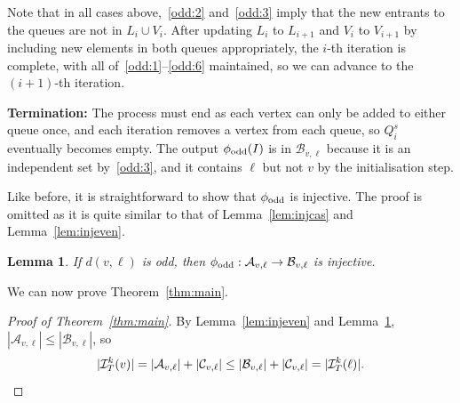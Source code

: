 \documentclass[11pt]{article}
\newtheorem{lemma}[theorem]{Lemma}
\theoremstyle{definition}
\newcommand{\cI}{\mathcal{I}}
\begin{document}
Note that in all cases above,~\ref{odd:2} and~\ref{odd:3} imply that the new entrants to the queues are not in $L_i\cup V_i$. After updating $L_i$ to $L_{i+1}$ and $V_i$ to $V_{i+1}$ by including new elements in both queues appropriately, the $i$-th iteration is complete, with all of~\ref{odd:1}--\ref{odd:6} maintained, so we can advance to the $(i+1)$-th iteration. 

\medskip

\noindent\textbf{Termination:} The process must end as each vertex can only be added to either queue once, and each iteration removes a vertex from each queue, so $Q_i^s$ eventually becomes empty. The output $\phi_{\textup{odd}}(I)$ is in $\mathcal{B}_{v,\ell}$ because it is an independent set by~\ref{odd:3}, and it contains $\ell$ but not $v$ by the initialisation step. 

\medskip

Like before, it is straightforward to show that $\phi_{\textup{odd}}$ is injective. The proof is omitted as it is quite similar to that of Lemma~\ref{lem:injcas} and Lemma~\ref{lem:injeven}. 
\begin{lemma}\label{lem:injodd}
If $d(v,\ell)$ is odd, then $\phi_{\textup{odd}}:\mathcal{A}_{v,\ell}\to\mathcal{B}_{v,\ell}$ is injective. 
\end{lemma}

We can now prove Theorem~\ref{thm:main}. 
\begin{proof}[Proof of Theorem~\ref{thm:main}]
By Lemma~\ref{lem:injeven} and Lemma~\ref{lem:injodd}, $|\mathcal{A}_{v,\ell}|\leq|\mathcal{B}_{v,\ell}|$, so  \[|\mathcal{I}_{T}^{k}(v)| = |\mathcal{A}_{v,\ell}| + |\mathcal{C}_{v,\ell}|\leq|\mathcal{B}_{v,\ell}|+|\mathcal{C}_{v,\ell}|=|\cI_T^k(\ell)|.\qedhere\]
\end{proof}
\end{document}
